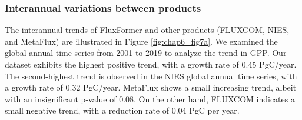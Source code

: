 \subsubsection{Interannual variations between products}

The interannual trends of FluxFormer and other products (FLUXCOM, NIES, and MetaFlux) are illustrated in Figure \ref{fig:chap6_fig7a}. We examined the global annual time series from 2001 to 2019 to analyze the trend in GPP. Our dataset exhibits the highest positive trend, with a growth rate of 0.45 PgC/year. The second-highest trend is observed in the NIES global annual time series, with a growth rate of 0.32 PgC/year. MetaFlux shows a small increasing trend, albeit with an insignificant p-value of 0.08. On the other hand, FLUXCOM indicates a small negative trend, with a reduction rate of 0.04 PgC per year.\par


